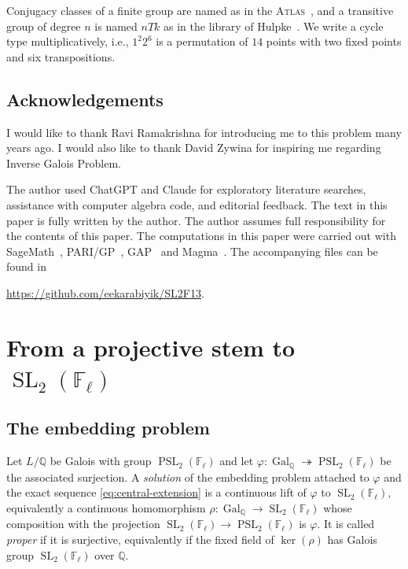 \documentclass[10pt]{amsart}
\numberwithin{equation}{section}
\newcommand{\GQ}{\Gal_{\Q}}
\theoremstyle{definition}
\theoremstyle{remark}
\newcommand{\F}{\mathbb{F}}
\newcommand{\Q}{\mathbb{Q}}
\newcommand{\SL}{\operatorname{SL}}
\newcommand{\PSL}{\operatorname{PSL}}
\newcommand{\Gal}{\operatorname{Gal}}
\begin{document}
Conjugacy classes of a finite group are named as in the
\textsc{Atlas}~\cite{Atlas1985}, and a transitive group of degree $n$ is
named $n T k$ as in the library of Hulpke~\cite{TransGrp}. We write a cycle type multiplicatively, i.e., $1^2 2^6$ is a permutation of $14$ points with two
fixed points and six transpositions. 


\subsection*{Acknowledgements}

 


I would like to thank Ravi Ramakrishna for introducing me to this problem many years ago. I would also like to thank David Zywina for inspiring me regarding Inverse Galois Problem. 

The author used ChatGPT and Claude for exploratory literature searches, assistance with computer algebra code, and editorial feedback. The text in this paper is fully written by the author. The author assumes full responsibility for the contents of this paper. 
The computations in this paper were carried out with
SageMath~\cite{SageMath}, PARI/GP~\cite{PARI2}, GAP~\cite{GAP} and Magma~\cite{Magma}. The accompanying files can be found in 
\begin{center}
    \href{https://github.com/eekarabiyik/SL2F13}{https://github.com/eekarabiyik/SL2F13}.
\end{center}



\section{From a projective stem to \texorpdfstring{$\SL_2(\F_\ell)$}
  {SL2(Fl)}}\label{sec:common}

\subsection{The embedding problem}\label{subsec:embedding}
Let $L/\Q$ be Galois with group $\PSL_2(\F_\ell)$ and let
$\varphi\colon\GQ\twoheadrightarrow \PSL_2(\F_\ell)$ be the associated surjection.  A
\emph{solution} of the embedding problem attached to $\varphi$ and the exact sequence
\eqref{eq:central-extension} is a continuous lift of $\varphi$ to $\SL_2(\F_\ell)$, equivalently a continuous homomorphism
$\rho\colon\GQ\to\SL_2(\F_\ell)$ whose composition with the projection
$\SL_2(\F_\ell)\to \PSL_2(\F_\ell)$ is $\varphi$. It is called \emph{proper} if it is surjective, equivalently if the fixed field of $\ker(\rho)$ has Galois group $\SL_2(\F_\ell)$ over $\Q$. 
\end{document}
